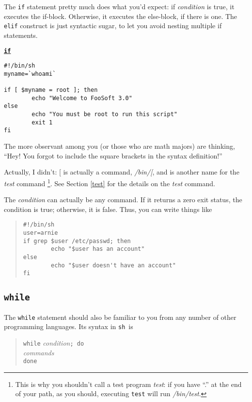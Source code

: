 \documentclass{article}
\newcommand{\heading}[1]{%
  \begin{center}
    \large\textbf{\underline{#1}}
  \end{center}
  \vspace{1ex minus 1ex}}
\newcommand{\fname}[1]{\textsl{#1}}
\newcommand{\code}[1]{\texttt{#1}}
\newcommand{\sh}{\code{sh}}
\newlength{\slidewidth}
\newenvironment{boxit}{%
  \begin{lrbox}{\savepar}
  \begin{minipage}[b]{\slidewidth}%
}{
  \end{minipage}
  \end{lrbox}
  \fbox{\usebox{\savepar}}
}
\newcommand{\slidecaption}{}
\newenvironment{slide}[1]{%
\renewcommand\figurename{Slide}
\renewcommand{\slidecaption}{#1}
\bigskip
\begin{boxit}
\heading{\slidecaption}
}{%
\end{boxit}
\bigskip
}
\begin{document}
	The \code{if} statement pretty much does what you'd expect: if
\textit{condition} is true, it executes the if-block. Otherwise, it
executes the else-block, if there is one. The \code{elif} construct is
just syntactic sugar, to let you avoid nesting multiple if statements.

\begin{slide}{\code{if}}
\begin{verbatim}
#!/bin/sh
myname=`whoami`

if [ $myname = root ]; then
        echo "Welcome to FooSoft 3.0"
else
        echo "You must be root to run this script"
        exit 1
fi
\end{verbatim}%
\end{slide}

	The more observant among you (or those who are math majors)
are thinking, ``Hey! You forgot to include the square brackets in the
syntax definition!''

	Actually, I didn't: [ is actually a command, \fname{/bin/[},
and is another name for the \fname{test} command%
\footnote{This is why you shouldn't call a test program \fname{test}:
if you have ``.'' at the end of your path, as you should, executing
\code{test} will run \fname{/bin/test}.}. See Section \ref{test} for
the details on the \fname{test} command.

	The \textit{condition} can actually be any command. If it
returns a zero exit status, the condition is true; otherwise, it is
false. Thus, you can write things like
\begin{quote}
\begin{verbatim}
#!/bin/sh
user=arnie
if grep $user /etc/passwd; then
        echo "$user has an account"
else
        echo "$user doesn't have an account"
fi
\end{verbatim}%
\end{quote}

\subsection{\code{while}}

	The \code{while} statement should also be familiar to you from
any number of other programming languages. Its syntax in \sh\ is
\begin{quote}
\begin{tabbing}
\code{while} \= \textit{condition}\code{; do}\\
	\> \textit{commands}\\
\code{done}
\end{tabbing}
\end{quote}
\end{document}
